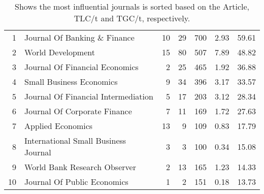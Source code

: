 \begin{table}[ht]
\begin{tabular}{rlrrrrr}
		1 & Journal Of Banking \& Finance &  10 &  29 & 700 & 2.93 & 59.61 \\ 
		2 & World Development &  15 &  80 & 507 & 7.89 & 48.82 \\ 
		3 & Journal Of Financial Economics &   2 &  25 & 465 & 1.92 & 36.88 \\ 
		4 & Small Business Economics &   9 &  34 & 396 & 3.17 & 33.57 \\ 
		5 & Journal Of Financial Intermediation &   5 &  17 & 203 & 3.12 & 28.34 \\ 
		6 & Journal Of Corporate Finance &   7 &  11 & 169 & 1.72 & 27.63 \\ 
		7 & Applied Economics &  13 &   9 & 109 & 0.83 & 17.79 \\ 
		8 & International Small Business Journal &   3 &   3 & 100 & 0.34 & 15.08 \\ 
		9 & World Bank Research Observer &   2 &  13 & 165 & 1.23 & 14.33 \\ 
		10 & Journal Of Public Economics &   1 &   2 & 151 & 0.18 & 13.73 \\ 
		\bottomrule

	\end{tabular}
	\caption{Shows the most influential journals is sorted based on the Article, TLC/t and TGC/t, respectively.} 
	\label{tab:Most-Cited-Journals}
\end{table}